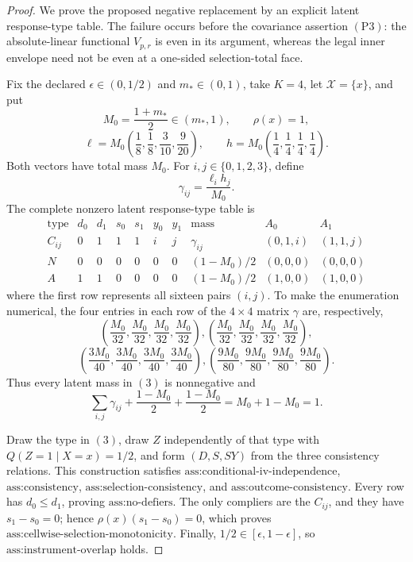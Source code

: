 \documentclass{article}
\begin{document}
\begin{proof}
We prove the proposed negative replacement by an explicit latent response-type table.  The failure occurs before the covariance assertion \((\mathrm{P3})\): the absolute-linear functional \(V_{p,r}\) is even in its argument, whereas the legal inner envelope need not be even at a one-sided selection-total face.

Fix the declared \(\epsilon\in(0,1/2)\) and \(m_*\in(0,1)\), take \(K=4\), let \(\mathcal X=\{x\}\), and put
\[
 M_0=\frac{1+m_*}{2}\in(m_*,1),\qquad \rho(x)=1,
\]
\[
 \ell=M_0\left(\frac18,\frac18,\frac3{10},\frac9{20}\right),
 \qquad
 h=M_0\left(\frac14,\frac14,\frac14,\frac14\right).
\tag{1}
\]
Both vectors have total mass \(M_0\).  For \(i,j\in\{0,1,2,3\}\), define
\[
 \gamma_{ij}=\frac{\ell_i h_j}{M_0}.
\tag{2}
\]
The complete nonzero latent response-type table is
\[
\begin{array}{c|cccccc|c|c|c}
\text{type}&d_0&d_1&s_0&s_1&y_0&y_1&\text{mass}&A_0&A_1\\ \hline
C_{ij}&0&1&1&1&i&j&\gamma_{ij}&(0,1,i)&(1,1,j)\\
N&0&0&0&0&0&0&(1-M_0)/2&(0,0,0)&(0,0,0)\\
A&1&1&0&0&0&0&(1-M_0)/2&(1,0,0)&(1,0,0)
\end{array}
\tag{3}
\]
where the first row represents all sixteen pairs \((i,j)\).  To make the enumeration numerical, the four entries in each row of the \(4\times4\) matrix \(\gamma\) are, respectively,
\[
 \left(\frac{M_0}{32},\frac{M_0}{32},\frac{M_0}{32},\frac{M_0}{32}\right),
 \left(\frac{M_0}{32},\frac{M_0}{32},\frac{M_0}{32},\frac{M_0}{32}\right),
\]
\[
 \left(\frac{3M_0}{40},\frac{3M_0}{40},\frac{3M_0}{40},\frac{3M_0}{40}\right),
 \left(\frac{9M_0}{80},\frac{9M_0}{80},\frac{9M_0}{80},\frac{9M_0}{80}\right).
\tag{4}
\]
Thus every latent mass in \((3)\) is nonnegative and
\[
 \sum_{i,j}\gamma_{ij}+\frac{1-M_0}{2}+\frac{1-M_0}{2}
 =M_0+1-M_0=1.
\tag{5}
\]

Draw the type in \((3)\), draw \(Z\) independently of that type with \(Q(Z=1\mid X=x)=1/2\), and form \((D,S,SY)\) from the three consistency relations.  This construction satisfies \(\text{ass:conditional-iv-independence}\), \(\text{ass:consistency}\), \(\text{ass:selection-consistency}\), and \(\text{ass:outcome-consistency}\).  Every row has \(d_0\le d_1\), proving \(\text{ass:no-defiers}\).  The only compliers are the \(C_{ij}\), and they have \(s_1-s_0=0\); hence \(\rho(x)(s_1-s_0)=0\), which proves \(\text{ass:cellwise-selection-monotonicity}\).  Finally, \(1/2\in[\epsilon,1-\epsilon]\), so \(\text{ass:instrument-overlap}\) holds.


\end{proof}
\end{document}
